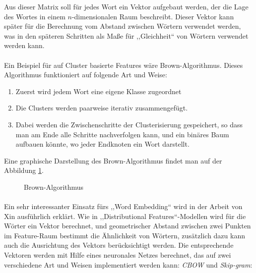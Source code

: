 Aus dieser Matrix soll für jedes Wort ein Vektor aufgebaut werden, der die Lage des Wortes in einem $n$-dimensionalen Raum beschreibt. Dieser Vektor kann später für die Berechnung vom Abstand zwischen Wörtern verwendet werden, was in den späteren Schritten als Maße für ,,Gleichheit`` von Wörtern verwendet werden kann.

\paragraph{}
Ein Beispiel für auf Cluster basierte Features wäre Brown-Algorithmus\cite{sun2011semi}. Dieses Algorithmus funktioniert auf folgende Art und Weise:
\begin{enumerate}
\item Zuerst wird jedem Wort eine eigene Klasse zugeordnet
\item Die Clusters werden paarweise iterativ zusammengefügt.
\item Dabei werden die Zwischenschritte der Clusterisierung gespeichert, so dass man am Ende alle Schritte nachverfolgen kann, und ein binäres Baum aufbauen könnte, wo jeder Endknoten ein Wort darstellt.  
\end{enumerate}

Eine graphische Darstellung des Brown-Algorithmus findet man auf der Abbildung \ref{fig:BROWN-CLUSTER}.

\begin{figure}[ht]
\vbox{\small}
\caption{Brown-Algorithmus}
\label{fig:BROWN-CLUSTER}
\end{figure}

\paragraph{}
Ein sehr interessanter Einsatz fürs ,,Word Embedding`` wird in der Arbeit von Xin\cite{rong2014word2vec} ausführlich erklärt. Wie in ,,Distributional Features``-Modellen wird für die Wörter ein Vektor berechnet, und geometrischer Abstand zwischen zwei Punkten im Feature-Raum bestimmt die Ähnlichkeit von Wörtern, zusätzlich dazu kann auch die Ausrichtung des Vektors berücksichtigt werden. Die entsprechende Vektoren werden mit Hilfe eines neuronales Netzes berechnet, das auf zwei verschiedene Art und Weisen implementiert werden kann: \textit{CBOW} und \textit{Skip-gram}\cite{wang2014introduction}:

